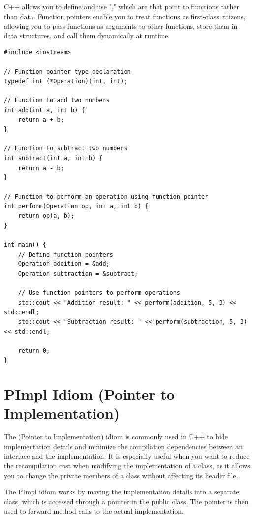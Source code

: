 C++ allows you to define and use "," which are  that point to functions rather than data. Function pointers enable you to treat functions as first-class citizens, allowing you to pass functions as arguments to other functions, store them in data structures, and call them dynamically at runtime.
\begin{lstlisting}
#include <iostream>

// Function pointer type declaration
typedef int (*Operation)(int, int);

// Function to add two numbers
int add(int a, int b) {
    return a + b;
}

// Function to subtract two numbers
int subtract(int a, int b) {
    return a - b;
}

// Function to perform an operation using function pointer
int perform(Operation op, int a, int b) {
    return op(a, b);
}

int main() {
    // Define function pointers
    Operation addition = &add;
    Operation subtraction = &subtract;

    // Use function pointers to perform operations
    std::cout << "Addition result: " << perform(addition, 5, 3) << std::endl;
    std::cout << "Subtraction result: " << perform(subtraction, 5, 3) << std::endl;

    return 0;
}
\end{lstlisting}














\section{PImpl Idiom (Pointer to Implementation)}

The  (Pointer to Implementation) idiom is commonly used in C++ to hide implementation details and minimize the compilation dependencies between an interface and the implementation. It is especially useful when you want to reduce the recompilation cost when modifying the implementation of a class, as it allows you to change the private members of a class without affecting its header file.

The PImpl idiom works by moving the implementation details into a separate class, which is accessed through a pointer in the public class. The pointer is then used to forward method calls to the actual implementation.

